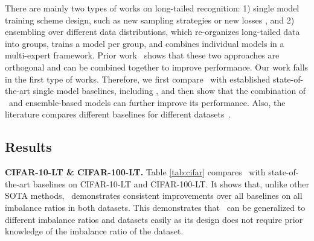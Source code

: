 There are mainly two types of works on long-tailed recognition: 1) single model training scheme design, such as new sampling strategies \cite{kang2019decoupling} or new losses \cite{cui2019class, cao2019learning, kang2020exploring}, and 2) ensembling over different data distributions, which re-organizes long-tailed data into groups, trains a model per group, and combines individual models in a multi-expert framework. Prior work~\cite{wang2020long} shows that these two approaches are orthogonal and can be combined together to improve performance. Our work falls in the first type of works. Therefore, we first compare \name~with  established state-of-the-art single model baselines, including \cite{cao2019learning, kang2019decoupling, kang2020exploring, kim2020m2m}, and then show that the combination of \name~and ensemble-based models can further improve its performance. Also, the literature compares different baselines for different datasets~\cite{yang2020rethinking,kang2020exploring,wang2020long}. 

\subsection{Results}

\textbf{CIFAR-10-LT \& CIFAR-100-LT.} Table \ref{tab:cifar} compares \name~with state-of-the-art baselines on CIFAR-10-LT and CIFAR-100-LT. It shows that, unlike other SOTA methods, \name~demonstrates consistent improvements over all baselines on all imbalance ratios in both datasets. This demonstrates that \name~can be generalized to different imbalance ratios and datasets easily as its design does not require prior knowledge of the imbalance ratio of the dataset.

